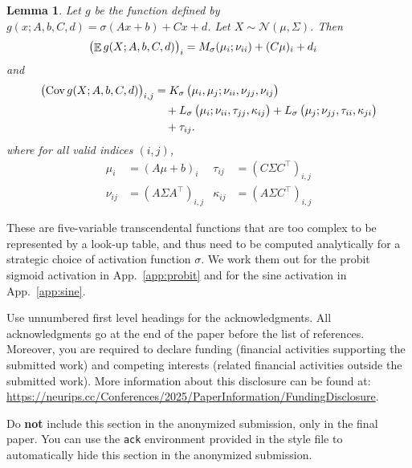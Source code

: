 \documentclass{article}
\newtheorem{lemma}{Lemma}
\DeclareMathOperator{\expect}{\mathbb{E}}
\DeclareMathOperator{\Cov}{\operatorname{Cov}}
\begin{document}
\begin{lemma}
  Let \(g\) be the function defined by \(g(x; A, b, C, d) = \sigma(A
  x+ b) + C x + d\).
  Let \(X \sim \mathcal N(\mu, \Sigma)\).
  Then
  \begin{align*}
    \del{\expect g(X; A, b, C, d)}_i &= M_\sigma(\mu_i; \nu_{ii}) +
    (C\mu)_i + d_i
  \end{align*}
  and
  \begin{align*}
    \begin{split}
      \del{\Cov g(X; A, b, C, d)}_{i, j} &=
        K_\sigma\del{
          \mu_i, \mu_j; \nu_{ii}, \nu_{jj}, \nu_{ij}
        } \\
        &\quad + L_\sigma\del{
          \mu_i; \nu_{ii}, \tau_{jj},\kappa_{ij}
        }
        + L_\sigma\del{
          \mu_j; \nu_{jj}, \tau_{ii},\kappa_{ji}
        } \\
        &\quad + \tau_{ij}.
    \end{split}
  \end{align*}
  where for all valid indices \((i, j)\),
  \begin{align*}
    \mu_i &= (A\mu + b)_i
    &
    \tau_{ij}
    &= (C\Sigma C^\intercal)_{i,j}
    \\
    \nu_{ij} &= (A\Sigma A^\intercal)_{i,j}
    &
    \kappa_{ij}
    &= (A \Sigma C^\intercal)_{i,j}
  \end{align*}
\end{lemma}
These are five-variable transcendental functions that are too complex to be represented by a look-up table, and thus need to be computed analytically for a strategic choice of activation function \(\sigma\).
We work them out for the probit sigmoid activation in App.~\ref{app:probit} and for the sine activation in App.~\ref{app:sine}.


\begin{ack}
Use unnumbered first level headings for the acknowledgments. All acknowledgments
go at the end of the paper before the list of references. Moreover, you are required to declare
funding (financial activities supporting the submitted work) and competing interests (related financial activities outside the submitted work).
More information about this disclosure can be found at: \url{https://neurips.cc/Conferences/2025/PaperInformation/FundingDisclosure}.


Do {\bf not} include this section in the anonymized submission, only in the final paper. You can use the \texttt{ack} environment provided in the style file to automatically hide this section in the anonymized submission.
\end{ack}
\end{document}
